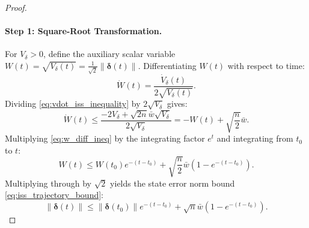 \documentclass[11pt]{article}
\begin{document}
\begin{proof}
\paragraph{Step 1: Square-Root Transformation.}
For $V_\delta > 0$, define the auxiliary scalar variable $W(t) = \sqrt{V_\delta(t)} = \frac{1}{\sqrt{2}}\|\boldsymbol{\delta}(t)\|$. Differentiating $W(t)$ with respect to time:
\begin{equation}
\dot{W}(t) = \frac{\dot{V}_\delta(t)}{2\sqrt{V_\delta(t)}}.
\end{equation}
Dividing \eqref{eq:vdot_iss_inequality} by $2\sqrt{V_\delta}$ gives:
\begin{equation}
\dot{W}(t) \le \frac{-2V_\delta + \sqrt{2n}\bar{w}\sqrt{V_\delta}}{2\sqrt{V_\delta}} = -W(t) + \sqrt{\frac{n}{2}}\bar{w}.
\label{eq:w_diff_ineq}
\end{equation}
Multiplying \eqref{eq:w_diff_ineq} by the integrating factor $e^t$ and integrating from $t_0$ to $t$:
\begin{equation}
W(t) \le W(t_0) e^{-(t - t_0)} + \sqrt{\frac{n}{2}}\bar{w}\left(1 - e^{-(t - t_0)}\right).
\end{equation}
Multiplying through by $\sqrt{2}$ yields the state error norm bound \eqref{eq:iss_trajectory_bound}:
\begin{equation}
\|\boldsymbol{\delta}(t)\| \le \|\boldsymbol{\delta}(t_0)\| e^{-(t - t_0)} + \sqrt{n}\bar{w}\left(1 - e^{-(t - t_0)}\right).
\end{equation}


\end{proof}
\end{document}
